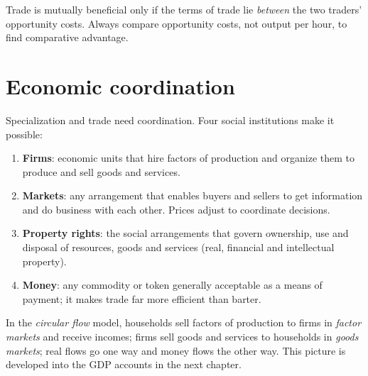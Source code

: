 \begin{important}[Pitfall]
Trade is mutually beneficial only if the terms of trade lie \emph{between} the two
traders' opportunity costs. Always compare opportunity costs, not output per hour, to find
comparative advantage.
\end{important}

\section{Economic coordination}

Specialization and trade need coordination. Four social institutions make it possible:
\begin{enumerate}
  \item \textbf{Firms}: economic units that hire factors of production and organize them
        to produce and sell goods and services.
  \item \textbf{Markets}: any arrangement that enables buyers and sellers to get
        information and do business with each other. Prices adjust to coordinate
        decisions.
  \item \textbf{Property rights}: the social arrangements that govern ownership, use and
        disposal of resources, goods and services (real, financial and intellectual
        property).
  \item \textbf{Money}: any commodity or token generally acceptable as a means of
        payment; it makes trade far more efficient than barter.
\end{enumerate}

In the \emph{circular flow} model, households sell factors of production to firms in
\emph{factor markets} and receive incomes; firms sell goods and services to households in
\emph{goods markets}; real flows go one way and money flows the other way. This picture
is developed into the GDP accounts in the next chapter.

